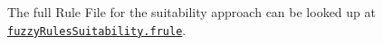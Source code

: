 The full Rule File for the suitability approach can be looked up at \href{https://github.com/AutoPas/AutoPas/blob/f77f10f72c19a86d5471bce287ae3a4ae344c012/examples/md-flexible/input/fuzzyRulesSuitability.frule}{\color{blue}\texttt{fuzzyRulesSuitability.frule}}.